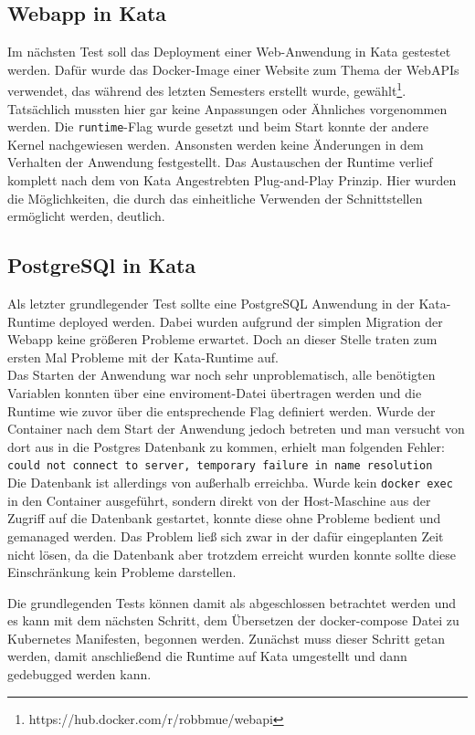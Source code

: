 \subsection{Webapp in Kata}
\label{ref:kata_plug_and_play}
Im nächsten Test soll das Deployment einer Web-Anwendung in Kata gestestet werden. 
Dafür wurde das Docker-Image einer Website zum Thema der Web\ac{API}s verwendet, das während des letzten Semesters erstellt wurde, gewählt\footnote{https://hub.docker.com/r/robbmue/webapi}. 
Tatsächlich mussten hier gar keine Anpassungen oder Ähnliches vorgenommen werden. 
Die \texttt{runtime}-Flag wurde gesetzt und beim Start konnte der andere Kernel nachgewiesen werden.
Ansonsten werden keine Änderungen in dem Verhalten der Anwendung festgestellt. 
Das Austauschen der Runtime verlief komplett nach dem von Kata Angestrebten Plug-and-Play Prinzip.
Hier wurden die Möglichkeiten, die durch das einheitliche Verwenden der Schnittstellen ermöglicht werden, deutlich. 

\subsection{PostgreSQl in Kata}
\label{ref:postgres_kata}
Als letzter grundlegender Test sollte eine PostgreSQL Anwendung in der Kata-Runtime deployed werden. 
Dabei wurden aufgrund der simplen Migration der Webapp keine größeren Probleme erwartet.
Doch an dieser Stelle traten zum ersten Mal Probleme mit der Kata-Runtime auf.
\\
Das Starten der Anwendung war noch sehr unproblematisch, alle benötigten Variablen konnten über eine enviroment-Datei übertragen werden und die Runtime wie zuvor über die entsprechende Flag definiert werden. 
Wurde der Container nach dem Start der Anwendung jedoch betreten und man versucht von dort aus in die Postgres Datenbank zu kommen, erhielt man folgenden Fehler:
\\\texttt{could not connect to server, temporary failure in name resolution}\\
Die Datenbank ist allerdings von außerhalb erreichba.
Wurde kein \texttt{docker exec} in den Container ausgeführt, sondern direkt von der Host-Maschine aus der Zugriff auf die Datenbank gestartet, konnte diese ohne Probleme bedient und gemanaged werden. 
Das Problem ließ sich zwar in der dafür eingeplanten Zeit nicht lösen, da die Datenbank aber trotzdem erreicht wurden konnte sollte diese Einschränkung kein Probleme darstellen. 

Die grundlegenden Tests können damit als abgeschlossen betrachtet werden und es kann mit dem nächsten Schritt, dem Übersetzen der docker-compose Datei zu Kubernetes Manifesten, begonnen werden. 
Zunächst muss dieser Schritt getan werden, damit anschließend die Runtime auf Kata umgestellt und dann gedebugged werden kann. 



